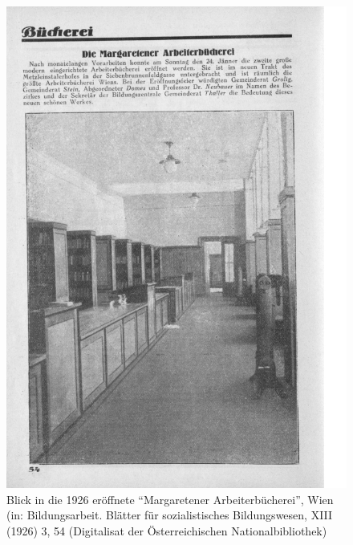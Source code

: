 \documentclass[a4paper,
fontsize=11pt,
oneside,
numbers=noperiodatend,
parskip=half-,
bibliography=totoc,
final
]{scrartcl}
\begin{document}
\begin{figure}
\centering
\includegraphics[width=.9\textwidth]{img/Schuldt01.jpg}
\caption{Blick in die 1926 eröffnete \enquote{Margaretener
Arbeiterbücherei}, Wien (in: Bildungsarbeit. Blätter für sozialistisches
Bildungswesen, XIII (1926) 3, 54 (Digitalisat der Österreichischen
Nationalbibliothek)}
\end{figure}
\end{document}
